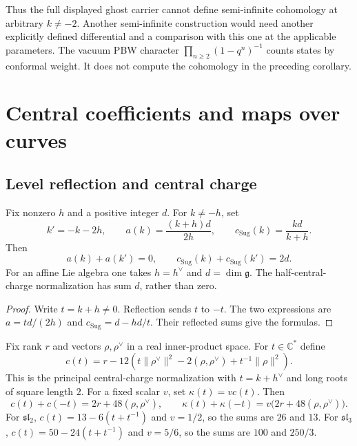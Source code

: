 Thus the full displayed ghost carrier cannot define semi-infinite cohomology at arbitrary $k\ne-2$.
Another semi-infinite construction would need another explicitly defined differential and a comparison with this one at the applicable parameters.
The vacuum PBW character $\prod_{n\geq2}(1-q^n)^{-1}$ counts states by conformal weight.
It does not compute the cohomology in the preceding corollary.

\section{Central coefficients and maps over curves}

\subsection{Level reflection and central charge}

\begin{proposition}
\label{cor:anomaly-duality-km}
Fix nonzero $h$ and a positive integer $d$.
For $k\ne-h$, set
\[
 k'=-k-2h,\qquad
 a(k)=\frac{(k+h)d}{2h},\qquad
 c_{\mathrm{Sug}}(k)=\frac{kd}{k+h}.
\]
Then
\[
 a(k)+a(k')=0,\qquad
 c_{\mathrm{Sug}}(k)+c_{\mathrm{Sug}}(k')=2d.
\]
For an affine Lie algebra one takes $h=h^\vee$ and $d=\dim\mathfrak g$.
The half-central-charge normalization has sum $d$, rather than zero.
\end{proposition}

\begin{proof}
Write $t=k+h\ne0$.
Reflection sends $t$ to $-t$.
The two expressions are $a=td/(2h)$ and $c_{\mathrm{Sug}}=d-hd/t$.
Their reflected sums give the formulas.
\end{proof}

\begin{proposition}
\label{cor:anomaly-duality-w}
Fix rank $r$ and vectors $\rho,\rho^\vee$ in a real inner-product space.
For $t\in\mathbb C^*$ define
\[
 c(t)=r-12\left(t\lVert\rho^\vee\rVert^2
             -2(\rho,\rho^\vee)+t^{-1}\lVert\rho\rVert^2\right).
\]
This is the principal central-charge normalization with $t=k+h^\vee$ and long roots of square length $2$.
For a fixed scalar $v$, set $\kappa(t)=v c(t)$.
Then
\[
 c(t)+c(-t)=2r+48(\rho,\rho^\vee),\qquad
 \kappa(t)+\kappa(-t)=v\bigl(2r+48(\rho,\rho^\vee)\bigr).
\]
For $\mathfrak{sl}_2$, $c(t)=13-6(t+t^{-1})$ and $v=1/2$, so the sums are $26$ and $13$.
For $\mathfrak{sl}_3$, $c(t)=50-24(t+t^{-1})$ and $v=5/6$, so the sums are $100$ and $250/3$.
\end{proposition}

